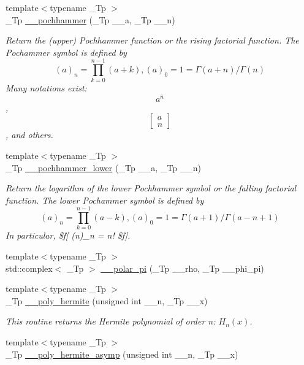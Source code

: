 \begin{DoxyCompactItemize}
{\footnotesize template$<$typename \+\_\+\+Tp $>$ }\\\+\_\+\+Tp \hyperlink{namespacestd_1_1____detail_ae1fb9f383f9b657f76d0c183ecd6ae29}{\+\_\+\+\_\+pochhammer} (\+\_\+\+Tp \+\_\+\+\_\+a, \+\_\+\+Tp \+\_\+\+\_\+n)
\begin{DoxyCompactList}\small\item\em Return the (upper) Pochhammer function or the rising factorial function. The Pochammer symbol is defined by \[ (a)_n = \prod_{k=0}^{n-1} (a + k), (a)_0 = 1 = \Gamma(a + n) / \Gamma(n) \] Many notations exist\+: \[ a^{\overline{n}} \], \[ \left[ \begin{array}{c} a \\ n \end{array} \right] \], and others. \end{DoxyCompactList}\item 
{\footnotesize template$<$typename \+\_\+\+Tp $>$ }\\\+\_\+\+Tp \hyperlink{namespacestd_1_1____detail_acd08cb0905b67d8a6a1c29fa5d46ec88}{\+\_\+\+\_\+pochhammer\+\_\+lower} (\+\_\+\+Tp \+\_\+\+\_\+a, \+\_\+\+Tp \+\_\+\+\_\+n)
\begin{DoxyCompactList}\small\item\em Return the logarithm of the lower Pochhammer symbol or the falling factorial function. The lower Pochammer symbol is defined by \[ (a)_n = \prod_{k=0}^{n-1} (a - k), (a)_0 = 1 = \Gamma(a + 1) / \Gamma(a - n + 1) \] In particular, \$f\mbox{[} (n)\+\_\+n = n! \$f\mbox{]}. \end{DoxyCompactList}\item 
{\footnotesize template$<$typename \+\_\+\+Tp $>$ }\\std\+::complex$<$ \+\_\+\+Tp $>$ \hyperlink{namespacestd_1_1____detail_ac69e259ad511fcc7a54c6ec315adcfa4}{\+\_\+\+\_\+polar\+\_\+pi} (\+\_\+\+Tp \+\_\+\+\_\+rho, \+\_\+\+Tp \+\_\+\+\_\+phi\+\_\+pi)
\item 
{\footnotesize template$<$typename \+\_\+\+Tp $>$ }\\\+\_\+\+Tp \hyperlink{namespacestd_1_1____detail_aca2f5400ce1d8ee26b9e0e9da74bda2c}{\+\_\+\+\_\+poly\+\_\+hermite} (unsigned int \+\_\+\+\_\+n, \+\_\+\+Tp \+\_\+\+\_\+x)
\begin{DoxyCompactList}\small\item\em This routine returns the Hermite polynomial of order n\+: $ H_n(x) $. \end{DoxyCompactList}\item 
{\footnotesize template$<$typename \+\_\+\+Tp $>$ }\\\+\_\+\+Tp \hyperlink{namespacestd_1_1____detail_a34d8e6d2be42c2e9abb21a3090725912}{\+\_\+\+\_\+poly\+\_\+hermite\+\_\+asymp} (unsigned int \+\_\+\+\_\+n, \+\_\+\+Tp \+\_\+\+\_\+x)

\end{DoxyCompactItemize}
